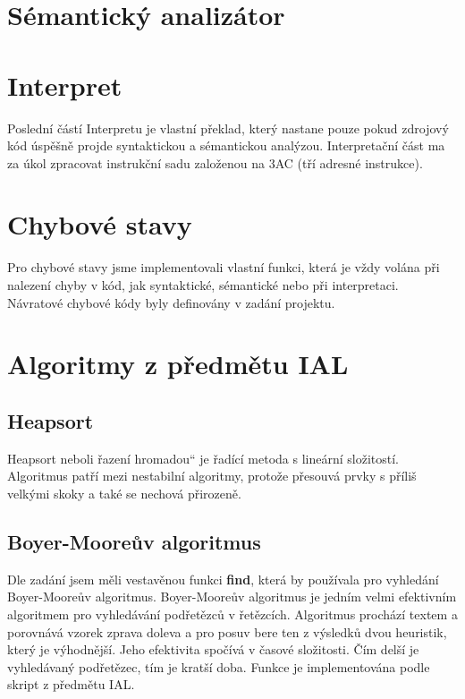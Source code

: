\documentclass[a4paper, 11pt, titlepage]{article}
\providecommand{\uv}[1]{\quotedblbase #1\textquotedblleft} %
\begin{document}
\newpage

\section{Sémantický analizátor}

\section{Interpret}
Poslední částí Interpretu je vlastní překlad, který nastane pouze pokud zdrojový kód úspěšně projde syntaktickou a sémantickou analýzou. Interpretační část ma za úkol zpracovat instrukční sadu založenou na 3AC (tří adresné instrukce).

\section{Chybové stavy}
Pro chybové stavy jsme implementovali vlastní funkci, která je vždy volána při nalezení chyby v kód, jak syntaktické, sémantické nebo při interpretaci. Návratové chybové kódy byly definovány v zadání projektu. 

\newpage

\section{Algoritmy z předmětu IAL}

\subsection{Heapsort}
Heapsort neboli \uv{řazení hromadou} je řadící metoda s lineární složitostí. Algoritmus patří mezi nestabilní algoritmy, protože přesouvá prvky s příliš velkými skoky a také se nechová přirozeně.  

\subsection{Boyer-Mooreův algoritmus}
Dle zadání jsem měli vestavěnou funkci \textbf{find}, která by používala pro vyhledání Boyer-Mooreův algoritmus.
Boyer-Mooreův algoritmus je jedním velmi efektivním algoritmem pro vyhledávání podřetězců v řetězcích. Algoritmus prochází textem a porovnává vzorek zprava doleva a pro posuv bere ten z výsledků dvou heuristik,
který je výhodnější. Jeho efektivita spočívá v časové složitosti. Čím delší je vyhledávaný podřetězec, tím je kratší doba. Funkce je implementována podle skript z předmětu IAL.
\end{document}
